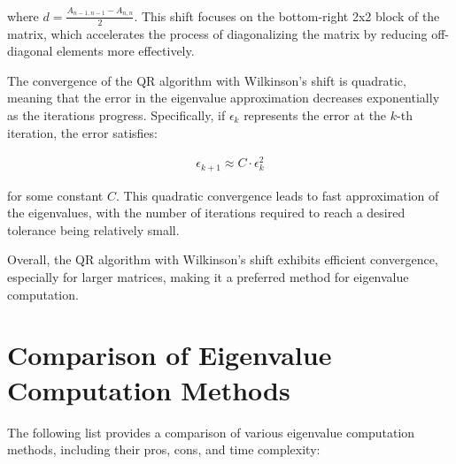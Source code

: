 \documentclass[journal]{IEEEtran}
\begin{document}
where \( d = \frac{A_{n-1,n-1} - A_{n,n}}{2} \). This shift focuses on the bottom-right 2x2 block of the matrix, which accelerates the process of diagonalizing the matrix by reducing off-diagonal elements more effectively.

The convergence of the QR algorithm with Wilkinson's shift is quadratic, meaning that the error in the eigenvalue approximation decreases exponentially as the iterations progress. Specifically, if \( \epsilon_k \) represents the error at the \( k \)-th iteration, the error satisfies:

\begin{align}
\epsilon_{k+1} \approx C \cdot \epsilon_k^2
\end{align}

for some constant \( C \). This quadratic convergence leads to fast approximation of the eigenvalues, with the number of iterations required to reach a desired tolerance being relatively small.

Overall, the QR algorithm with Wilkinson's shift exhibits efficient convergence, especially for larger matrices, making it a preferred method for eigenvalue computation.
\section{Comparison of Eigenvalue Computation Methods}

The following list provides a comparison of various eigenvalue computation methods, including their pros, cons, and time complexity:
\end{document}
